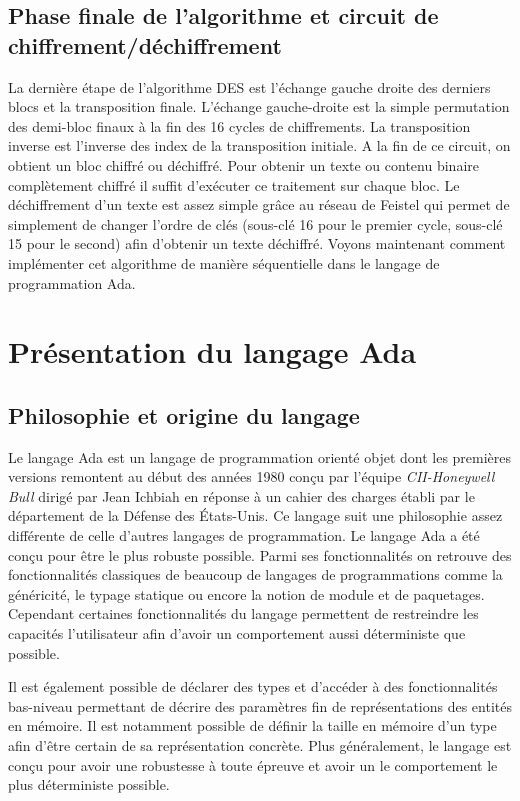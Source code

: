 \documentclass[a4paper]{article}
\begin{document}
\subsection{Phase finale de l'algorithme et circuit de chiffrement/déchiffrement}
La dernière étape de l'algorithme DES est l'échange gauche droite des derniers blocs et la transposition finale. L'échange gauche-droite est la simple permutation des demi-bloc finaux à la fin des 16 cycles de chiffrements. La transposition inverse est l'inverse des index de la transposition initiale.
\smallbreak
A la fin de ce circuit, on obtient un bloc chiffré ou déchiffré. Pour obtenir un texte ou contenu binaire complètement chiffré il suffit d'exécuter ce traitement sur chaque bloc. Le déchiffrement d'un texte  est assez simple grâce au réseau de Feistel qui permet de simplement de changer l'ordre de clés (sous-clé 16 pour le premier cycle, sous-clé 15 pour le second) afin d'obtenir un texte déchiffré.
\smallbreak
Voyons maintenant comment implémenter cet algorithme de manière séquentielle dans le langage de programmation Ada.


\section{Présentation du langage Ada}

\subsection{Philosophie et origine du langage}
Le langage Ada est un langage de programmation orienté objet dont les premières versions remontent au début des années 1980 conçu par l'équipe \emph{CII-Honeywell Bull} dirigé par Jean Ichbiah en réponse à un cahier des charges établi par le département de la Défense des États-Unis. Ce langage suit une philosophie assez différente de celle d'autres langages de programmation.
\smallbreak
Le langage Ada a été conçu pour être le plus robuste possible. Parmi ses fonctionnalités on retrouve des fonctionnalités classiques de beaucoup de langages de programmations comme la généricité, le typage statique ou encore la notion de module et de paquetages. Cependant certaines fonctionnalités du langage permettent de restreindre les capacités l'utilisateur afin d'avoir un comportement aussi déterministe que possible.
\smallbreak

Il est également possible de déclarer des types et d'accéder à des fonctionnalités bas-niveau permettant de décrire des paramètres fin de représentations des entités en mémoire. Il est notamment possible de définir la taille en mémoire d'un type afin d'être certain de sa représentation concrète.
\smallbreak
Plus généralement, le langage est conçu pour avoir une robustesse à toute épreuve et avoir un le comportement le plus déterministe possible.
\end{document}
